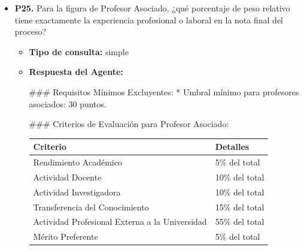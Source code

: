 \documentclass{article}
\begin{document}
\begin{itemize}
\begin{itemize}
\begin{scriptsize}
                  \textbf{Complemento (multiplicativo):}
                  - Factor de corrección de 1,5 para cursos de formación e innovación docente correspondientes a los últimos 5 cursos académicos (incluido el curso académico de fecha de convocatoria de la plaza).
                  - \textbf{1,5 x 10 h. docencia no oficial}
                \end{scriptsize}
        \end{itemize}


  \item \textbf{P25.} Para la figura de Profesor Asociado, ¿qué porcentaje de peso relativo tiene exactamente la experiencia profesional o laboral en la nota final del proceso? \\
        \begin{itemize}
          \item \textbf{Tipo de consulta:} simple
          \item \textbf{Respuesta del Agente:}

                \#\#\# Requisitos Mínimos Excluyentes:
                * Umbral mínimo para profesores asociados: 30 puntos.

                \#\#\# Criterios de Evaluación para Profesor Asociado:

                \vspace{0.4cm}
                \begin{table}[h!]\centering\renewcommand{\arraystretch}{1.3}
                  \begin{tabular}{|p{}|p{}|}\hline
                    Criterio                                       & Detalles       \\\hline
                    Rendimiento Académico                          & 5\% del total  \\\hline
                    Actividad Docente                              & 10\% del total \\\hline
                    Actividad Investigadora                        & 10\% del total \\\hline
                    Transferencia del Conocimiento                 & 15\% del total \\\hline
                    Actividad Profesional Externa a la Universidad & 55\% del total \\\hline
                    Mérito Preferente                              & 5\% del total  \\\hline
                  \end{tabular}\end{table}
                \vspace{0.4cm}


\end{itemize}
\end{itemize}
\end{document}

